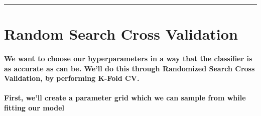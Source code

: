 \documentclass[11pt]{article}
\begin{document}
    \begin{center}\rule{0.5\linewidth}{\linethickness}\end{center}

    \section{Random Search Cross
Validation}\label{random-search-cross-validation}

    \paragraph{We want to choose our hyperparameters in a way that the
classifier is as accurate as can be. We'll do this through Randomized
Search Cross Validation, by performing K-Fold
CV.}\label{we-want-to-choose-our-hyperparameters-in-a-way-that-the-classifier-is-as-accurate-as-can-be.-well-do-this-through-randomized-search-cross-validation-by-performing-k-fold-cv.}

    \paragraph{First, we'll create a parameter grid which we can sample from
while fitting our
model}\label{first-well-create-a-parameter-grid-which-we-can-sample-from-while-fitting-our-model}
\end{document}
